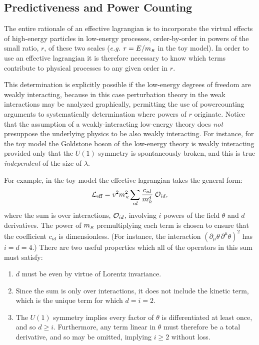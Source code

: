 \subsection{Predictiveness and Power Counting}

The entire rationale of an effective lagrangian is
to incorporate the virtual effects of high-energy particles
in low-energy processes, order-by-order in powers of
the small ratio, $r$, of these two scales ({\it e.g.}
$r = E/m_{\scriptscriptstyle R}$ in the toy model). In order to 
use an effective lagrangian it is therefore necessary
to know which terms contribute to physical processes
to any given order in $r$. 

This determination is explicitly possible if the low-energy degrees 
of freedom are weakly interacting, because in this case perturbation
theory in the weak interactions may be analyzed graphically,
permitting the use of powercounting arguments to
systematically determination where powers
of $r$ originate. Notice that the assumption of a weakly-interacting
low-energy theory does {\it not} presuppose the underlying
physics to be also weakly interacting. For instance, for the
toy model the Goldstone boson of the low-energy theory is
weakly interacting provided only that the $U(1)$ symmetry 
is spontaneously broken, and this is true 
{\it independent} of the size of $\lambda$. 

For example, in the toy model the effective lagrangian takes the
general form: 
%
\begin{equation}
\label{genformLeff}
{\cal L}_{\rm eff} = v^2 m_{\scriptscriptstyle R}^2 \sum_{id} {c_{id} 
\over m_{\scriptscriptstyle R}^d} \; {\cal O}_{id},
\end{equation}
%
where the sum is over interactions, ${\cal O}_{id}$, 
involving $i$ powers of the field $\theta$ and $d$ 
derivatives. The power of $m_{\scriptscriptstyle R}$ premultiplying
each term is chosen to ensure that the coefficient 
$c_{id}$ is dimensionless. (For instance, the interaction
$(\partial_\mu \theta \, \partial^\mu \theta)^2$ has
$i = d = 4$.) There are two useful properties which
all of the operators in this sum must satisfy:
%
\begin{enumerate}
\item
$d$ must be even by virtue of Lorentz invariance.
%
\item
Since the sum is only over interactions,
it does not include the kinetic term, which is the unique
term for which $d=i=2$.
%
\item
The $U(1)$ symmetry implies every factor of $\theta$
is differentiated at least once, and so $d \ge i$. Furthermore,
any term linear in $\theta$ must therefore be a total 
derivative, and so may be omitted, implying 
$i \ge 2$ without loss. 
\end{enumerate}

